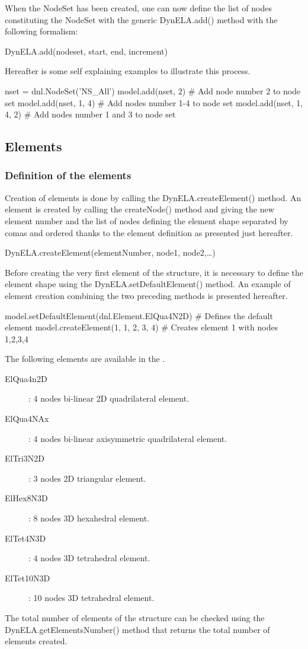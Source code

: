 When the \textsf{NodeSet} has been created, one can now define the list of nodes constituting the \textsf{NodeSet} with the generic \textsf{DynELA.add()} method with the following formalism:

\textsf{DynELA.add(nodeset, start, end, increment)}

Hereafter is some self explaining examples to illustrate this process.

\begin{PythonListing}
nset = dnl.NodeSet('NS_All')
model.add(nset, 2)       # Add node number 2 to node set
model.add(nset, 1, 4)    # Add nodes number 1-4 to node set
model.add(nset, 1, 4, 2) # Add nodes number 1 and 3 to node set
\end{PythonListing}

\subsection{Elements}

\subsubsection{Definition of the elements}

Creation of elements is done by calling the \textsf{DynELA.createElement()} method. An element is created by calling the \textsf{createNode()} method and giving the new element number and the list of nodes defining the element shape separated by comas and ordered thanks to the element definition as presented just hereafter.

\textsf{DynELA.createElement(elementNumber, node1, node2,\ldots)}

Before creating the very first element of the structure, it is necessary to define the element shape using the \textsf{DynELA.setDefaultElement()} method. An example of element creation combining the two preceding methods is presented hereafter.

\begin{PythonListing}
model.setDefaultElement(dnl.Element.ElQua4N2D) # Defines the default element
model.createElement(1, 1, 2, 3, 4)             # Creates element 1 with nodes 1,2,3,4
\end{PythonListing}

The following elements are available in the \DynELA.
\begin{description}
\item [ElQua4n2D]: 4 nodes bi-linear 2D quadrilateral element.
\item [ElQua4NAx]: 4 nodes bi-linear axisymmetric quadrilateral element.
\item [ElTri3N2D]: 3 nodes 2D triangular element.
\item [ElHex8N3D]: 8 nodes 3D hexahedral element.
\item [ElTet4N3D]: 4 nodes 3D tetrahedral element.
\item [ElTet10N3D]: 10 nodes 3D tetrahedral element.
\end{description}
The total number of elements of the structure can be checked using the \textsf{DynELA.getElementsNumber()} method that returns the total number of elements created.

